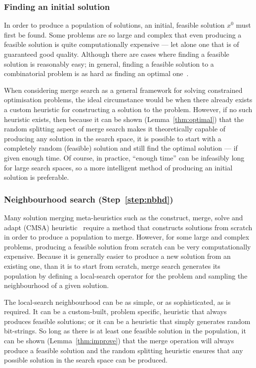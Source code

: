 \documentclass[preprint]{elsarticle}
\begin{document}
\subsubsection*{\textbf{Finding an initial solution}}
In order to produce a population of solutions, an initial, feasible solution $x^0$ must first be found. Some problems are so large and complex that even producing a feasible solution is quite computationally expensive --- let alone one that is of guaranteed good quality. Although there are cases where finding a feasible solution is reasonably easy; in general, finding a feasible solution to a combinatorial problem is as hard as finding an optimal one~\citep{copalg}.

When considering merge search as a general framework for solving constrained optimisation problems, the ideal circumstance would be when there already exists a custom heuristic for constructing a solution to the problem. However, if no such heuristic exists, then because it can be shown (Lemma~\ref{thm:optimal}) that the random splitting aspect of merge search makes it theoretically capable of producing any solution in the search space, it is possible to start with a completely random (feasible) solution and still find the optimal solution --- if given enough time. Of course, in practice, ``enough time'' can be infeasibly long for large search spaces, so a more intelligent method of producing an initial solution is preferable.

\subsubsection*{\textbf{Neighbourhood search (Step~\ref{step:nbhd})}}

Many solution merging meta-heuristics such as the construct, merge, solve and adapt (CMSA) heuristic~\citep{cmsa} require a method that constructs solutions from scratch in order to produce a population to merge. However, for some large and complex problems, producing a feasible solution from scratch can be very computationally expensive. Because it is generally easier to produce a new solution from an existing one, than it is to start from scratch, merge search generates its population by defining a local-search operator for the problem and sampling the neighbourhood of a given solution.

The local-search neighbourhood can be as simple, or as sophisticated, as is required. It can be a custom-built, problem specific, heuristic that always produces feasible solutions; or it can be a heuristic that simply generates random bit-strings. So long as there is at least one feasible solution in the population, it can be shown (Lemma~\ref{thm:improve}) that the merge operation will always produce a feasible solution and the random splitting heuristic ensures that any possible solution in the search space can be produced.
\end{document}
